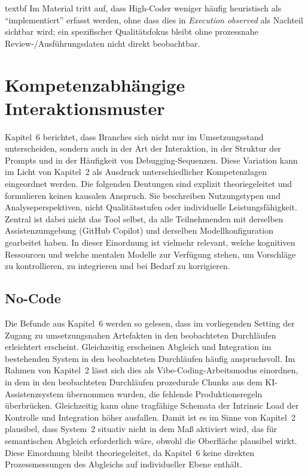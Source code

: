 	\csname textbf Im Material tritt auf, dass High-Coder weniger h\"aufig heuristisch als \enquote{implementiert} erfasst werden, ohne dass dies in \textit{Execution observed} als Nachteil sichtbar wird; ein spezifischer Qualit\"atsfokus bleibt ohne prozessnahe Review-/Ausf\"uhrungsdaten nicht direkt beobachtbar.

\section{Kompetenzabh\"angige Interaktionsmuster}
\label{sec:discussion_competence_patterns}

Kapitel~6 berichtet, dass Branches sich nicht nur im Umsetzungsstand unterscheiden, sondern auch in der Art der Interaktion, in der Struktur der Prompts und in der H\"aufigkeit von Debugging-Sequenzen.
Diese Variation kann im Licht von Kapitel~2 als Ausdruck unterschiedlicher Kompetenzlagen eingeordnet werden.
Die folgenden Deutungen sind explizit theoriegeleitet und formulieren keinen kausalen Anspruch.
Sie beschreiben Nutzungstypen und Analyseperspektiven, nicht Qualit\"atsstufen oder individuelle Leistungsf\"ahigkeit.
Zentral ist dabei nicht das Tool selbst, da alle Teilnehmenden mit derselben Assistenzumgebung (GitHub Copilot) und derselben Modellkonfiguration gearbeitet haben.
In dieser Einordnung ist vielmehr relevant, welche kognitiven Ressourcen und welche mentalen Modelle zur Verf\"ugung stehen, um Vorschl\"age zu kontrollieren, zu integrieren und bei Bedarf zu korrigieren.

\subsection{No-Code}
\label{sec:discussion_no_code}

Die Befunde aus Kapitel~6 werden so gelesen, dass im vorliegenden Setting der Zugang zu umsetzungsnahen Artefakten in den beobachteten Durchl\"aufen erleichtert erscheint.
Gleichzeitig erscheinen Abgleich und Integration im bestehenden System in den beobachteten Durchl\"aufen h\"aufig anspruchsvoll.
Im Rahmen von Kapitel~2 l\"asst sich dies als Vibe-Coding-Arbeitsmodus einordnen, in dem in den beobachteten Durchl\"aufen prozedurale Chunks aus dem KI-Assistenzsystem \"ubernommen wurden, die fehlende Produktionsregeln \"uberbr\"ucken.
Gleichzeitig kann ohne tragf\"ahige Schemata der Intrinsic Load der Kontrolle und Integration h\"oher ausfallen.
Damit ist es im Sinne von Kapitel~2 plausibel, dass System~2 situativ nicht in dem Ma\ss{} aktiviert wird, das f\"ur semantischen Abgleich erforderlich w\"are, obwohl die Oberfl\"ache plausibel wirkt.
Diese Einordnung bleibt theoriegeleitet, da Kapitel~6 keine direkten Prozessmessungen des Abgleichs auf individueller Ebene enth\"alt.

